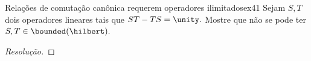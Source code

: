\begin{exercício}{Relações de comutação canônica requerem operadores ilimitados}{ex41}
  Sejam \(S, T\) dois operadores lineares tais que \(ST - TS = \unity.\) Mostre que não se pode ter \(S, T \in \bounded(\hilbert).\)
\end{exercício}
\begin{proof}[Resolução]

\end{proof}
